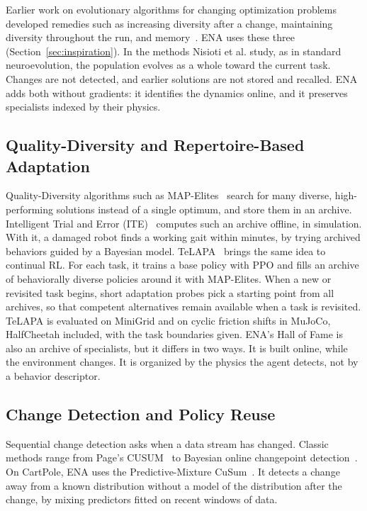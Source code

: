 Earlier work on evolutionary algorithms for changing optimization problems developed remedies such as increasing diversity after a change, maintaining diversity throughout the run, and memory~\cite{yazdani2021survey}. ENA uses these three (Section~\ref{sec:inspiration}). In the methods Nisioti et al. study, as in standard neuroevolution, the population evolves as a whole toward the current task. Changes are not detected, and earlier solutions are not stored and recalled. ENA adds both without gradients: it identifies the dynamics online, and it preserves specialists indexed by their physics.

\subsection{Quality-Diversity and Repertoire-Based Adaptation}
Quality-Diversity algorithms such as MAP-Elites~\cite{mouret2015illuminating} search for many diverse, high-performing solutions instead of a single optimum, and store them in an archive. Intelligent Trial and Error (ITE)~\cite{cully2015robots} computes such an archive offline, in simulation. With it, a damaged robot finds a working gait within minutes, by trying archived behaviors guided by a Bayesian model. TeLAPA~\cite{lillo2026beyond} brings the same idea to continual RL. For each task, it trains a base policy with PPO and fills an archive of behaviorally diverse policies around it with MAP-Elites. When a new or revisited task begins, short adaptation probes pick a starting point from all archives, so that competent alternatives remain available when a task is revisited. TeLAPA is evaluated on MiniGrid and on cyclic friction shifts in MuJoCo, HalfCheetah included, with the task boundaries given. ENA's Hall of Fame is also an archive of specialists, but it differs in two ways. It is built online, while the environment changes. It is organized by the physics the agent detects, not by a behavior descriptor.

\subsection{Change Detection and Policy Reuse}
Sequential change detection asks when a data stream has changed. Classic methods range from Page's CUSUM~\cite{page1954continuous} to Bayesian online changepoint detection~\cite{adams2007bayesian}. On CartPole, ENA uses the Predictive-Mixture CuSum~\cite{halme2026sequential}. It detects a change away from a known distribution without a model of the distribution after the change, by mixing predictors fitted on recent windows of data.

